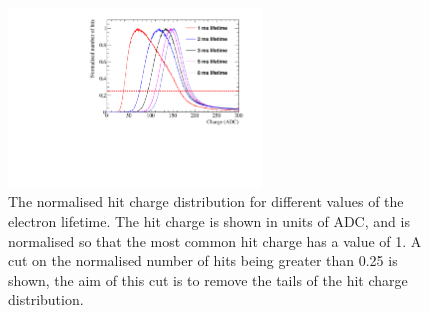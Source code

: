 \begin{figure}
  \centering
  \includegraphics[width=0.6\textwidth]{Canvas_ChargeCut_ElecLifetime}
  \caption[The normalised hit charge distribution for different values of the electron lifetime]
          {The normalised hit charge distribution for different values of the electron lifetime. The hit charge is shown in units of ADC, and is normalised so that the most common hit charge has a value of 1. A cut on the normalised number of hits being greater than 0.25 is shown, the aim of this cut is to remove the tails of the hit charge distribution.}
  \label{fig:DiffLifeStudy_ChargeCut}
\end{figure}


